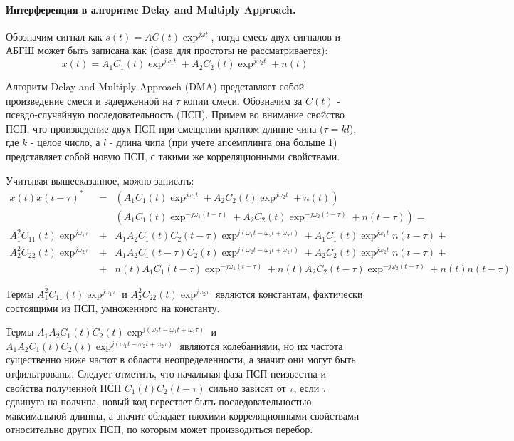 \documentclass[a4paper,12pt]{scrartcl} %
\begin{document}
\paragraph{Интерференция в алгоритме Delay and Multiply Approach.}

Обозначим сигнал как ${s(t)=A C(t) \exp^{j \omega t}}$, тогда смесь двух сигналов и АБГШ может быть записана как (фаза для простоты не рассматривается):
\begin{equation}
	x(t) = A_1 C_1(t) \exp^{j \omega_1 t} + A_2 C_2(t) \exp^{j \omega_2 t} + n(t)
\end{equation}

Алгоритм Delay and Multiply Approach (DMA) представляет собой произведение смеси и задерженной на ${\tau}$ копии смеси. Обозначим за ${C(t)}$ - псевдо-случайную
последовательность (ПСП). Примем во внимание свойство ПСП, что произведение двух ПСП при смещении кратном длинне чипа (${\tau = kl}$), где ${k}$ - целое число,
а ${l}$ - длина чипа (при учете апсемплинга она больше 1) представляет собой новую ПСП, с такими же корреляционными свойствами.

Учитывая вышесказанное, можно записать:
\begin{eqnarray}
	x(t)x(t-\tau)^* & = & 	\left( A_1 C_1(t) \exp^{j \omega_1 t} + A_2 C_2(t) \exp^{j \omega_2 t} + n(t) \right) \\
		        &   &	\left( A_1 C_1(t) \exp^{-j \omega_1 (t-\tau)} + A_2 C_2(t) \exp^{-j \omega_2 (t-\tau)} + n(t-\tau) \right)  =  \nonumber  \\
	 A_1^2 C_{11}(t)\exp^{j \omega_1 \tau} & + & A_1 A_2 C_1(t)C_2(t-\tau) \exp^{j(\omega_1 t - \omega_2 t + \omega_2 \tau)} + A_1 C_1(t)\exp^{j \omega_1 t} n(t-\tau) + \nonumber \\
	 A_2^2 C_{22}(t)\exp^{j \omega_2 \tau} & + & A_1 A_2 C_1(t-\tau)C_2(t) \exp^{j(\omega_2 t - \omega_1 t + \omega_1 \tau)} + A_2 C_2(t) \exp^{j \omega_2 t}n(t-\tau) + \nonumber \\
			& + & n(t) A_1 C_1(t-\tau)\exp^{-j \omega_1 (t-\tau)} + n(t) A_2 C_2(t-\tau)\exp^{-j \omega_2 (t-\tau)} + n(t)n(t-\tau) \nonumber
\end{eqnarray}

Термы ${A_1^2 C_{11}(t)\exp^{j \omega_1 \tau}}$ и ${A_2^2 C_{22}(t)\exp^{j \omega_2 \tau}}$ являются константам, фактически состоящими из ПСП, умноженного на константу.

Термы ${A_1 A_2 C_1(t)C_2(t) \exp^{j(\omega_2 t - \omega_1 t + \omega_1 \tau)}}$ и ${A_1 A_2 C_1(t)C_2(t) \exp^{j(\omega_1 t - \omega_2 t + \omega_2 \tau)}}$ являются
колебаниями, но их частота существенно ниже частот в области неопределенности, а значит они могут быть отфильтрованы. Следует отметить, что начальная фаза ПСП неизвестна
и свойства полученной ПСП ${C_1(t)C_2(t-\tau)}$ сильно зависят от ${\tau}$, если ${\tau}$ сдвинута на полчипа, новый код перестает быть последовательностью максимальной длинны,
а значит обладает плохими корреляционными свойствами относительно других ПСП, по которым может производиться перебор.
\end{document}
